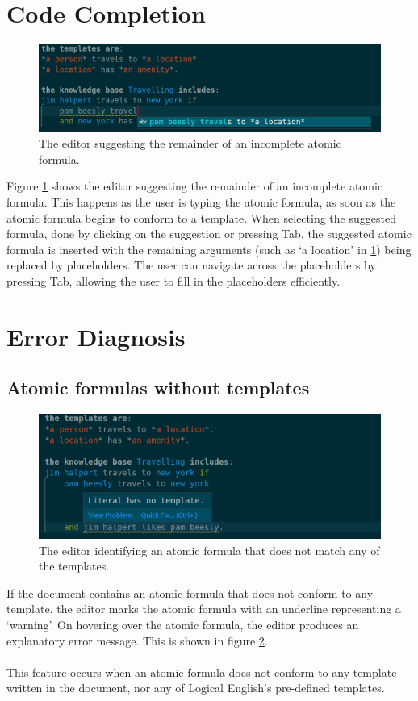 \documentclass[../main.tex]{subfiles}
\begin{document}
\section{Code Completion}\begin{figure}[h!]
\centering
\includegraphics[width = \linewidth]{./figures/auto-suggest.png}
\caption{The editor suggesting the remainder of an incomplete atomic formula.}
\label{fig:code-completion}
\end{figure}
Figure \ref{fig:code-completion} shows the editor suggesting the remainder of an incomplete atomic formula. This happens as the user is typing the atomic formula, as soon as the atomic formula begins to conform to a template. When selecting the suggested formula, done by clicking on the suggestion or pressing Tab, the suggested atomic formula is inserted with the remaining arguments (such as `a location' in \ref{fig:code-completion}) being replaced by placeholders. The user can navigate across the placeholders by pressing Tab, allowing the user to fill in the placeholders efficiently.

\section{Error Diagnosis}
\subsection{Atomic formulas without templates}
\label{section:no-template-feature}
\begin{figure}[h!]
\centering
\includegraphics[width = \linewidth]{./figures/literal-wo-template.png}
\caption{The editor identifying an atomic formula that does not match any of the templates.}
\label{fig:no-template-diag}
\end{figure}
If the document contains an atomic formula that does not conform to any template, the editor marks the atomic formula with an underline representing a `warning'. On hovering over the atomic formula, the editor produces an explanatory error message. This is shown in figure \ref{fig:no-template-diag}.
\\ 
\\
This feature occurs when an atomic formula does not conform to any template written in the document, nor any of Logical English's pre-defined templates.
\end{document}
